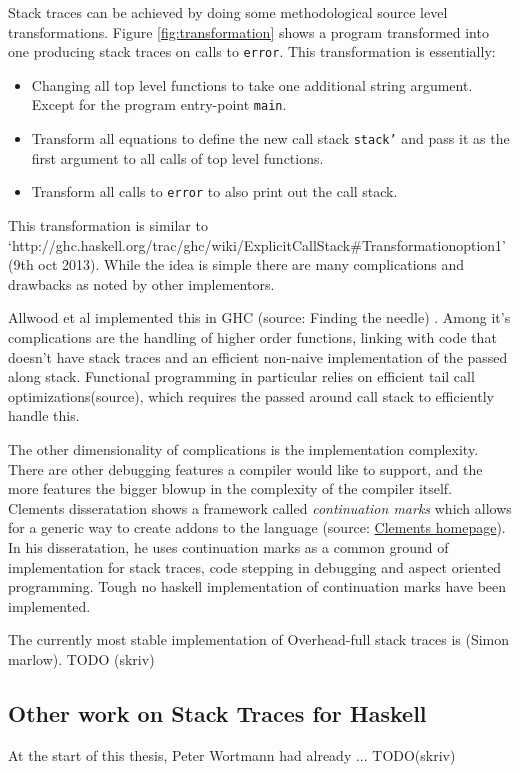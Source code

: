 Stack traces can be achieved by doing some methodological source level
transformations. Figure \ref{fig:transformation} shows a program transformed
into one producing stack traces on calls to \texttt{error}. This transformation is essentially:

\begin{itemize}
\itemsep1pt\parskip0pt
\item
  Changing all top level functions to take one additional string
  argument. Except for the program entry-point \texttt{main}.
\item
  Transform all equations to define the new call stack \texttt{stack'} and
  pass it as the first argument to all calls of top level functions.
\item
  Transform all calls to \texttt{error} to also print out the call stack.
\end{itemize}

This transformation is similar to
`http://ghc.haskell.org/trac/ghc/wiki/ExplicitCallStack\#Transformationoption1'
(9th oct 2013). While the idea is simple there are many complications and
drawbacks as noted by other implementors.

Allwood et al implemented this in GHC (source: Finding the needle) . Among it's complications are the
handling of higher order functions, linking with code that doesn't have stack
traces and an efficient non-naive implementation of the
passed along stack. Functional programming in particular relies on efficient
tail call optimizations(source), which requires the passed around call stack to
efficiently handle this.

The other dimensionality of complications is the implementation complexity.
There are other debugging features a compiler would like to support, and the
more features the bigger blowup in the complexity of the compiler itself.
Clements disseratation shows a framework called \emph{continuation marks} which
allows for a generic way to create addons to the language (source:
\href{http://www.brinckerhoff.org/clements/papers/index.html}{Clements
  homepage}).  In his disseratation, he uses continuation marks as a common
ground of implementation for stack traces, code stepping in debugging and
aspect oriented programming.  Tough no haskell implementation of continuation
marks have been implemented.

The currently most stable implementation of Overhead-full stack traces is 
(Simon marlow). TODO (skriv) %

\subsection{Other work on Stack Traces for Haskell}

At the start of this thesis, Peter Wortmann had already ... TODO(skriv) %
